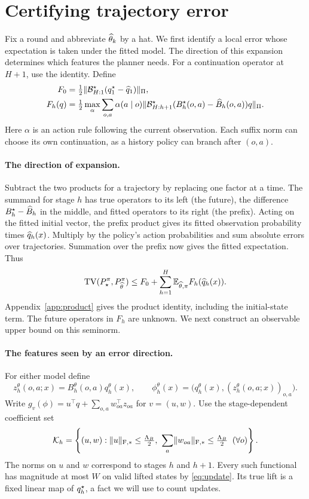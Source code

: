 \section{Certifying trajectory error}\label{sec:certificate}
Fix a round and abbreviate $\widehat\theta_k$ by a hat. We first identify a local error whose expectation is taken under the fitted model. The direction of this expansion determines which features the planner needs. For a continuation operator at $H+1$, use the identity. Define
\begin{align}
 F_0 &= \tfrac12\lVert \mathcal B^\star_{H:1}(q_1^\star-\widehat q_1)\rVert_{\Pi},\nonumber\\
 F_h(q)&=\tfrac12\max_\alpha\sum_{o,a}\alpha(a\mid o)
 \lVert \mathcal B^\star_{H:h+1}(B_h^\star(o,a)-\widehat B_h(o,a))q\rVert_{\Pi}.
 \label{eq:F}
\end{align}
Here $\alpha$ is an action rule following the current observation. Each suffix norm can choose its own continuation, as a history policy can branch after $(o,a)$.

\paragraph{The direction of expansion.}
Subtract the two products for a trajectory by replacing one factor at a time. The summand for stage $h$ has true operators to its left (the future), the difference $B_h^\star-\widehat B_h$ in the middle, and fitted operators to its right (the prefix). Acting on the fitted initial vector, the prefix product gives its fitted observation probability times $\widehat q_h(x)$. Multiply by the policy's action probabilities and sum absolute errors over trajectories. Summation over the prefix now gives the fitted expectation. Thus
\begin{equation}
 \operatorname{TV}(P_\star^\pi,P_{\widehat\theta}^\pi)
 \le F_0+\sum_{h=1}^H\mathbb E_{\widehat\theta,\pi} F_h(\widehat q_h(x)).
 \label{eq:telescope}
\end{equation}
Appendix~\ref{app:product} gives the product identity, including the initial-state term. The future operators in $F_h$ are unknown. We next construct an observable upper bound on this seminorm.

\paragraph{The features seen by an error direction.}
For either model define
\[
 z_h^\theta(o,a;x)=B_h^\theta(o,a)q_h^\theta(x),\qquad
 \phi_h^\theta(x)=\big(q_h^\theta(x),(z_h^\theta(o,a;x))_{o,a}\big).
\]
Write $g_v(\phi)=u^\top q+\sum_{o,a}w_{oa}^\top z_{oa}$ for $v=(u,w)$. Use the stage-dependent coefficient set
\begin{equation}
 \mathcal K_h=\left\{(u,w):
 \lVert u\rVert_{\mathrm F,*}\le\tfrac{\Lambda_B}{2},\
 \sum_a\lVert w_{oa}\rVert_{\mathrm F,*}\le\tfrac{\Lambda_B}{2}\;\;(\forall o)\right\}.
 \label{eq:geometry}
\end{equation}
The norms on $u$ and $w$ correspond to stages $h$ and $h+1$. Every such functional has magnitude at most $W$ on valid lifted states by \eqref{eq:update}. Its true lift is a fixed linear map of $q_h^\star$, a fact we will use to count updates.


